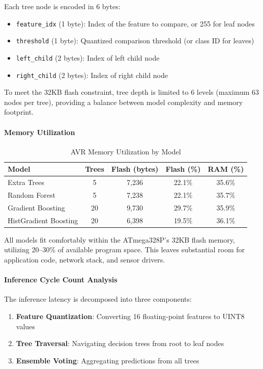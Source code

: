 Each tree node is encoded in 6 bytes:
\begin{itemize}
    \item \texttt{feature\_idx} (1 byte): Index of the feature to compare, or 255 for leaf nodes
    \item \texttt{threshold} (1 byte): Quantized comparison threshold (or class ID for leaves)
    \item \texttt{left\_child} (2 bytes): Index of left child node
    \item \texttt{right\_child} (2 bytes): Index of right child node
\end{itemize}

To meet the 32KB flash constraint, tree depth is limited to 6 levels (maximum 63 nodes per tree), providing a balance between model complexity and memory footprint.

\paragraph{Memory Utilization}

\begin{table}[htbp]
\centering
\caption{AVR Memory Utilization by Model}
\label{tab:avr_memory}
\begin{tabular}{lcccc}
\hline
\textbf{Model} & \textbf{Trees} & \textbf{Flash (bytes)} & \textbf{Flash (\%)} & \textbf{RAM (\%)} \\
\hline
Extra Trees & 5 & 7,236 & 22.1\% & 35.6\% \\
Random Forest & 5 & 7,238 & 22.1\% & 35.7\% \\
Gradient Boosting & 20 & 9,730 & 29.7\% & 35.9\% \\
HistGradient Boosting & 20 & 6,398 & 19.5\% & 36.1\% \\
\hline
\end{tabular}
\end{table}

All models fit comfortably within the ATmega328P's 32KB flash memory, utilizing 20--30\% of available program space. This leaves substantial room for application code, network stack, and sensor drivers.

\paragraph{Inference Cycle Count Analysis}

The inference latency is decomposed into three components:

\begin{enumerate}
    \item \textbf{Feature Quantization}: Converting 16 floating-point features to UINT8 values
    \item \textbf{Tree Traversal}: Navigating decision trees from root to leaf nodes
    \item \textbf{Ensemble Voting}: Aggregating predictions from all trees
\end{enumerate}

